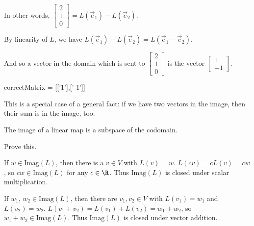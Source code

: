 \documentclass{ximera}
\begin{document}
\begin{question}
\begin{solution}
    \begin{hint}
      In other words, $\begin{bmatrix} 2 \\ 1 \\ 0 \end{bmatrix} = L(\vec{e}_1) - L(\vec{e}_2)$.
    \end{hint}

    \begin{hint}
      By linearity of $L$, we have $L(\vec{e}_1) - L(\vec{e}_2) = L(\vec{e}_1 - \vec{e}_2)$.
    \end{hint}

    \begin{hint}
      And so a vector in the domain which is sent to $\begin{bmatrix} 2 \\ 1 \\ 0 \end{bmatrix}$ is the vector $\begin{bmatrix} 1 \\ -1 \end{bmatrix}$.
    \end{hint}

    \begin{matrix-answer}[name=v]
      correctMatrix = [['1'],['-1']]
    \end{matrix-answer}
  \end{solution}

  This is a special case of a general fact: if we have two vectors in the image, then their sum is in the image, too.

  \begin{theorem}
    The image of a linear map is a subspace of the codomain.
  \end{theorem}

  Prove this.

  \begin{free-response}
    If $w \in \text{Imag}(L)$, then there is a $v \in V$ with $L(v) =w$.  $L(cv) = cL(v)=cw$, so $cw \in \text{Imag}(L)$ for any $c\in \R$. 
    Thus $\text{Imag}(L)$ is closed under scalar multiplication.
    
    If $w_1$, $w_2 \in \text{Imag}(L)$, then there are $v_1,v_2 \in V$ with $L(v_1)=w_1$ and $L(v_2)=w_2$.  $L(v_1+v_2)=L(v_1)+L(v_2)=w_1+w_2$, so $w_1+w_2 \in \text{Imag}(L)$.
    Thus $\text{Imag}(L)$ is closed under vector addition.
  \end{free-response}

\end{question}
\end{document}
